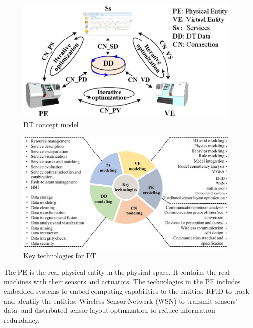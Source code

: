 \documentclass[article]{aaltoseries}
\begin{document}
\begin{figure}[t!]
	\begin{center}
		\includegraphics[width=1\textwidth]{figures/Tao_DT_concept_model}
		\caption{DT concept model \cite{Tao2019}}
		\label{fig:Tao_DT_concept_model}
	\end{center}
\end{figure}

\begin{figure}[t!]
	\begin{center}
		\includegraphics[width=1\textwidth]{figures/Tao_DT_key_techs}
		\caption{Key technologies for DT \cite{Tao2019}}
		\label{fig:Tao_DT_key_techs}
	\end{center}
\end{figure}

The PE is the real physical entity in the physical space. It contains the real machines with their sensors and actuators. The technologies in the PE includes embedded systems to embed computing capabilities to the entities, RFID to track and identify the entities, Wireless Sensor Network (WSN) to transmit sensors' data, and distributed sensor layout optimization to reduce information redundancy.
\end{document}
